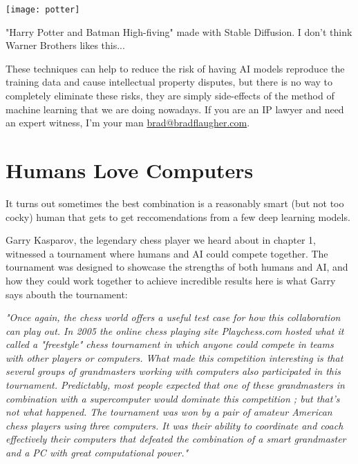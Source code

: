 \begin{marginfigure}[-5.5cm]
        \texttt{[image: potter]}
        \caption{"Harry Potter and Batman High-fiving" made with Stable Diffusion. I don't think Warner Brothers likes this...}
\end{marginfigure}

These techniques can help to reduce the risk of having AI models reproduce the training data and cause intellectual property disputes, but there is no way to completely eliminate these risks, they are simply side-effects of the method of machine learning that we are doing nowadays. If you are an IP lawyer and need an expert witness, I'm your man \href{mailto:brad@bradflaugher.com}{brad@bradflaugher.com}.

\section{Humans Love Computers}

It turns out sometimes the best combination is a reasonably smart (but not too cocky) human that gets to get reccomendations from a few deep learning models. 

Garry Kasparov, the legendary chess player we heard about in chapter 1, witnessed a tournament where humans and AI could compete together. The tournament was designed to showcase the strengths of both humans and AI, and how they could work together to achieve incredible results here is what Garry says abouth the tournament:

\textit{"Once again, the chess world offers a useful test case for how this collaboration can play out. In 2005 the online chess playing site Playchess.com hosted what it called a "freestyle" chess tournament in which anyone could compete in teams with other players or computers. What made this competition interesting is that several groups of grandmasters working with computers also participated in this tournament. Predictably, most people expected that one of these grandmasters in combination with a supercomputer would dominate this competition ; but that's not what happened. The tournament was won by a pair of amateur American chess players using three computers. It was their ability to coordinate and coach effectively their computers that defeated the combination of a smart grandmaster and a PC with great computational power."}


